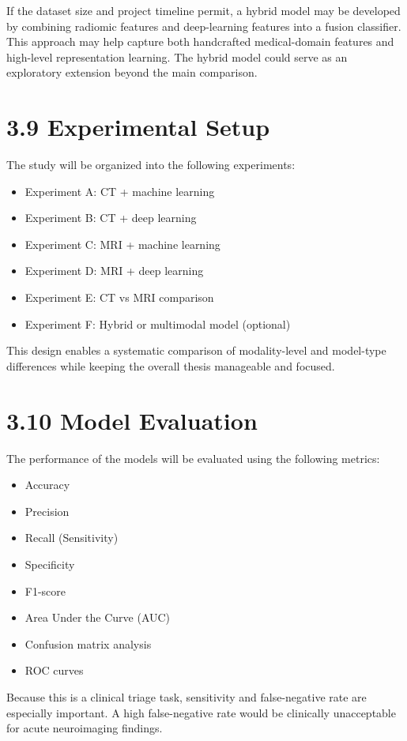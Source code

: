 \documentclass[12pt,a4paper]{report}
\begin{document}
If the dataset size and project timeline permit, a hybrid model may be developed by combining radiomic features and deep-learning features into a fusion classifier. This approach may help capture both handcrafted medical-domain features and high-level representation learning. The hybrid model could serve as an exploratory extension beyond the main comparison.

\section{3.9 Experimental Setup}

The study will be organized into the following experiments:

\begin{itemize}
\item Experiment A: CT + machine learning
\item Experiment B: CT + deep learning
\item Experiment C: MRI + machine learning
\item Experiment D: MRI + deep learning
\item Experiment E: CT vs MRI comparison
\item Experiment F: Hybrid or multimodal model (optional)
\end{itemize}

This design enables a systematic comparison of modality-level and model-type differences while keeping the overall thesis manageable and focused.

\section{3.10 Model Evaluation}

The performance of the models will be evaluated using the following metrics:

\begin{itemize}
\item Accuracy
\item Precision
\item Recall (Sensitivity)
\item Specificity
\item F1-score
\item Area Under the Curve (AUC)
\item Confusion matrix analysis
\item ROC curves
\end{itemize}

Because this is a clinical triage task, sensitivity and false-negative rate are especially important. A high false-negative rate would be clinically unacceptable for acute neuroimaging findings.
\end{document}

